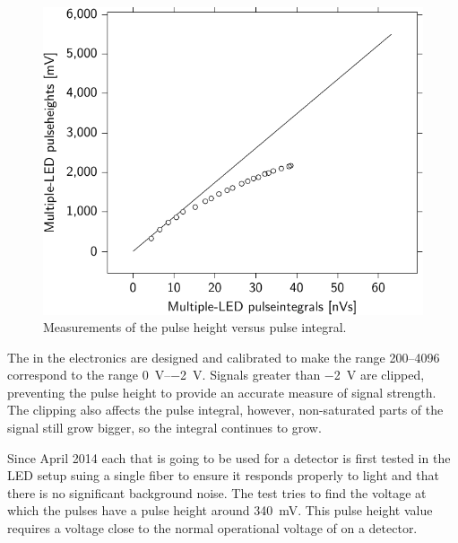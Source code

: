 \begin{figure}
    \centering
    \includegraphics{plots/calibration/linearity_senstech_ph_pi}
    \caption{Measurements of the pulse height versus pulse integral.}
    \label{fig:linearity_senstech_ph_pi}
\end{figure}

The \adcs in the \hisparc electronics are designed and calibrated to make the range \SIrange{200}{4096}{\adc} correspond to the range \SIrange{0}{-2}{\volt}. Signals greater than \SI{-2}{\volt} are clipped, preventing the pulse height to provide an accurate measure of signal strength. The clipping also affects the pulse integral, however, non-saturated parts of the signal still grow bigger, so the integral continues to grow.


Since April 2014 each \pmt that is going to be used for a \hisparc detector is first tested in the LED setup suing a single fiber to ensure it responds properly to light and that there is no significant background noise. The test tries to find the voltage at which the pulses have a pulse height around \SI{340}{\milli\volt}. This pulse height value requires a voltage close to the normal operational voltage of \pmts on a \hisparc detector.



